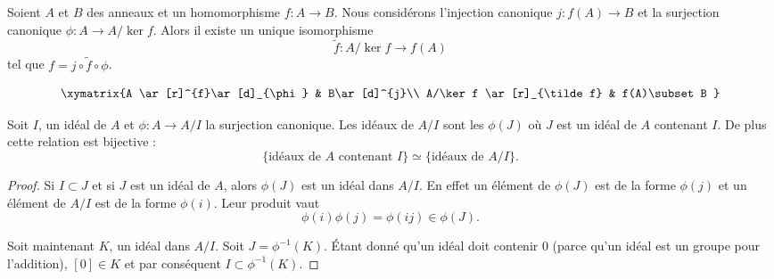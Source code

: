 \begin{proposition}
    Soient \( A\) et \( B\) des anneaux et un homomorphisme \( f\colon A\to B\). Nous considérons l'injection canonique \( j\colon f(A)\to B\) et la surjection canonique \( \phi\colon A\to A/\ker f\). Alors il existe un unique isomorphisme
    \begin{equation}
        \tilde f \colon A/\ker f\to f(A)
    \end{equation}
    tel que \( f=j\circ\tilde f\circ\phi\).

    \begin{equation}
        \xymatrix{%
        A \ar[r]^{f}\ar[d]_{\phi}        &   B\ar[d]^{j}\\
           A/\ker f \ar[r]_{\tilde f}   &   f(A)\subset B
           }
    \end{equation}
\end{proposition}

\begin{proposition}     \label{PropIJJIdsousphi}
    Soit \( I\), un idéal de \( A\) et \( \phi\colon A\to A/I\) la surjection canonique. Les idéaux de \( A/I\) sont les \( \phi(J)\) où \( J\) est un idéal de \( A\) contenant \( I\). De plus cette relation est bijective :
    \begin{equation}        \label{EqKbrizu}
        \{ \text{idéaux de } A\text{ contenant } I\}\simeq\{ \text{idéaux de } A/I \}.
    \end{equation}
\end{proposition}

\begin{proof}
    Si \( I\subset J\) et si \( J \) est un idéal de \( A\), alors \( \phi(J)\) est un idéal dans \( A/I\). En effet un élément de \( \phi(J)\) est de la forme \( \phi(j)\) et un élément de \( A/I\) est de la forme \( \phi(i)\). Leur produit vaut
    \begin{equation}
        \phi(i)\phi(j)=\phi(ij)\in\phi(J).
    \end{equation}
    
    Soit maintenant \( K\), un idéal dans \( A/I\). Soit \( J=\phi^{-1}(K)\). Étant donné qu'un idéal doit contenir \( 0\) (parce qu'un idéal est un groupe pour l'addition), \( [0]\in K\) et par conséquent \( I\subset\phi^{-1}(K)\).
\end{proof}


